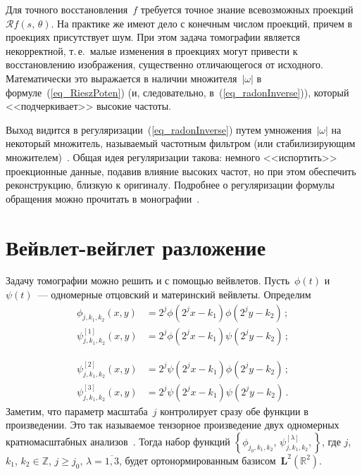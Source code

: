 \begin{multicols}{2}
Для точного восстановления~$f$ требуется точное знание всевозможных проекций~$\mathcal{R}f(s,\,\theta)$. 
На практике же имеют дело с конечным числом проекций, причем в проекциях присутствует шум.
При этом задача томографии является некорректной, т.\,е.\ малые изменения в проекциях могут 
при\-вес\-ти к восстановлению изображения, существенно отличающегося от исходного. Математически
это выражается в наличии множителя~$|\omega|$ в формуле~(\ref{eq_RieszPoten}) (и, следовательно, 
в~(\ref{eq_radonInverse})), который <<подчеркивает>> высокие частоты.

Выход видится в регуляризации~(\ref{eq_radonInverse}) путем умножения~$|\omega|$ на некоторый множитель, 
называемый частотным фильтром (или стабилизирующим множителем)~\cite{TikhonovArsenin}. 
Общая идея регуляризации такова:\linebreak
немного <<испортить>> проекционные данные, подавив влияние 
высоких частот, но при этом обеспечить реконструкцию, близкую к оригиналу. Подроб\-нее о 
регуляризации формулы обращения можно прочитать в монографии~\cite{Herman}.

\section{Вейвлет-вейглет разложение}

Задачу томографии можно решить и с помощью вейвлетов. Пусть~$\phi(t)$ и~$\psi(t)$~--- 
одномерные отцовский и материнский вейвлеты. Определим
\begin{align*}
\phi_{j,k_1,k_2}(x,y) &= 2^{j} \phi\left(2^jx-k_1\right) \phi\left(2^jy-k_2\right)\,;\\
\psi^{[1]}_{j,k_1,k_2}(x,y) &= 2^{j} \phi\left(2^jx-k_1\right) \psi\left(2^jy-k_2\right)\,;
\end{align*}

\noindent
\begin{align*}
\psi^{[2]}_{j,k_1,k_2}(x,y) &= 2^{j} \psi\left(2^jx-k_1\right) \phi\left(2^jy-k_2\right)\,;\\
\psi^{[3]}_{j,k_1,k_2}(x,y) &= 2^{j} \psi\left(2^jx-k_1\right) \psi\left(2^jy-k_2\right)\,.
\end{align*}
Заметим, что параметр масштаба~$j$ контролирует сразу обе функции в произведении. 
Это так называемое тензорное произведение двух одномерных кратномасштабных анализов~\cite{Daub}. 
Тогда набор функций $\left\{ \phi_{j_0,k_1,k_2}, \, \psi^{[\lambda]}_{j,k_1,k_2}, \right\}$, 
где $j$, $k_1$, $k_2\in\mathbb{Z}$, $j\geq j_0$, $\lambda=\overline{1,3}$, 
будет ортонормированным базисом~$\mathbf{L}^2(\mathbb{R}^2)$.


\end{multicols}
